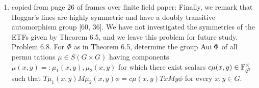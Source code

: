 \documentclass[12pt]{amsart}
\begin{document}
\begin{enumerate}
    \newpage
    \item copied from page 26 of frames over finite field paper: Finally, we remark that Hoggar’s lines are highly symmetric and have a doubly
    transitive automorphism group [60, 36]. We have not investigated the symmetries
    of the ETFs given by Theorem 6.5, and we leave this problem for future study.
    Problem 6.8. For $\Phi$ as in Theorem 6.5, determine the group $\operatorname{\mathrm{Aut}}\Phi$ of all permu
   tations $\mu\in S(G \times G)$ having components $\mu(x,y) =: \mu_1(x,y),\mu_2(x,y)$ for which
    there exist scalars $c\mu(x,y) \in \mathbb{F}^\times_{q^2}$
   such that $T\mu_1(x,y)M\mu_2(x,y)\phi = c\mu(x,y)TxMy\phi$ for
    every $x,y \in G$.
\end{enumerate}
\end{document}

